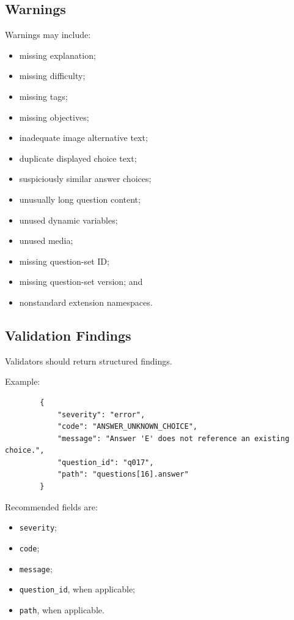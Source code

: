 \documentclass[11pt]{article}
\begin{document}
	\subsection{Warnings}
	
	Warnings may include:
	
	\begin{itemize}
		\item missing explanation;
		\item missing difficulty;
		\item missing tags;
		\item missing objectives;
		\item inadequate image alternative text;
		\item duplicate displayed choice text;
		\item suspiciously similar answer choices;
		\item unusually long question content;
		\item unused dynamic variables;
		\item unused media;
		\item missing question-set ID;
		\item missing question-set version; and
		\item nonstandard extension namespaces.
	\end{itemize}
	
	\subsection{Validation Findings}
	
	Validators should return structured findings.
	
	Example:
	
	\begin{lstlisting}
		{
			"severity": "error",
			"code": "ANSWER_UNKNOWN_CHOICE",
			"message": "Answer 'E' does not reference an existing choice.",
			"question_id": "q017",
			"path": "questions[16].answer"
		}
	\end{lstlisting}
	
	Recommended fields are:
	
	\begin{itemize}
		\item \texttt{severity};
		\item \texttt{code};
		\item \texttt{message};
		\item \texttt{question\_id}, when applicable;
		\item \texttt{path}, when applicable.
	\end{itemize}
	
\end{document}
